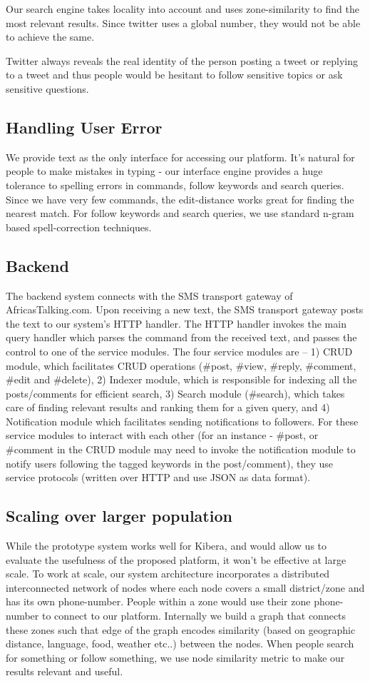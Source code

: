 \documentclass{chi-ext}
\begin{document}
Our search engine takes locality into account and uses zone-similarity to find the most relevant results. Since twitter uses a global number, they would not be able to achieve the same.

Twitter always reveals the real identity of the person posting a tweet or replying to a tweet and thus people would be hesitant to follow sensitive topics or ask sensitive questions. 

\subsection{Handling User Error}
We provide text as the only interface for accessing our platform. It's natural for people to make mistakes in typing - our interface engine provides a huge tolerance to spelling errors in commands, follow keywords and search queries. Since we have very few commands, the edit-distance works great for finding the nearest match. For follow keywords and search queries, we use standard n-gram based spell-correction techniques.


\subsection{Backend}
The backend system connects with the SMS transport gateway of AfricasTalking.com.  Upon receiving a new text, the SMS transport gateway posts the text to our system's HTTP handler. The HTTP handler invokes the main query handler which parses the command from the received text, and passes the control to one of the service modules. The four service modules are -- 1) CRUD module, which facilitates CRUD operations (\#post, \#view, \#reply, \#comment, \#edit and \#delete), 2) Indexer module, which is responsible for indexing all the posts/comments for efficient search, 3) Search module (\#search), which takes care of finding relevant results and ranking them for a given query,  and 4) Notification module which facilitates sending notifications to followers. For these service modules to interact with each other (for an instance - \#post, or \#comment  in the CRUD module may need to invoke the notification module to notify users following the tagged keywords in the post/comment), they use service protocols (written over HTTP and use JSON as data format).

\subsection{Scaling over larger population}
While the prototype system  works well for Kibera, and would allow us to evaluate the usefulness of the proposed platform, it won't be effective at large scale. To work at scale, our system architecture incorporates a distributed interconnected network of nodes where each node covers a small district/zone and has its own phone-number.  People within a zone would use their zone phone-number to connect to our platform. Internally we build a graph that connects these zones such that edge of the graph encodes similarity (based on geographic distance, language, food, weather etc..) between the nodes. When people search for something or follow something, we use node similarity metric to make our results relevant and useful.
\end{document}

